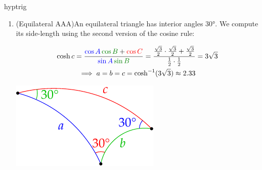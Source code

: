 \begin{examples}{}{hyptrig}
\begin{enumerate}
	 	\item (Equilateral AAA)\lstsp An equilateral triangle has interior angles $\ang{30}$. We compute its side-length using the second version of the cosine rule:\par
	 	\begin{minipage}[t]{0.65\linewidth}\vspace{-8pt}
	 	\begin{gather*}
	 		\cosh c =\frac{\textcolor{blue}{\cos A}\,\textcolor{Green}{\cos B}+\textcolor{red}{\cos C}}{\textcolor{blue}{\sin A}\,\textcolor{Green}{\sin B}} =\frac{\frac{\sqrt 3}2\cdot\frac{\sqrt 3}2+\frac{\sqrt 3}2}{\frac 12\cdot\frac 12} =3\sqrt 3\\
	 		\implies a=b=c=\cosh^{-1}(3\sqrt 3) \approx 2.33
	 	\end{gather*}
	  \end{minipage}
	  \hfill
	  \begin{minipage}[t]{0.34\linewidth}\vspace{-8pt}
	  	\flushright\includegraphics{isom-trigequil}
	  \end{minipage}
	 	

\end{enumerate}
\end{examples}
